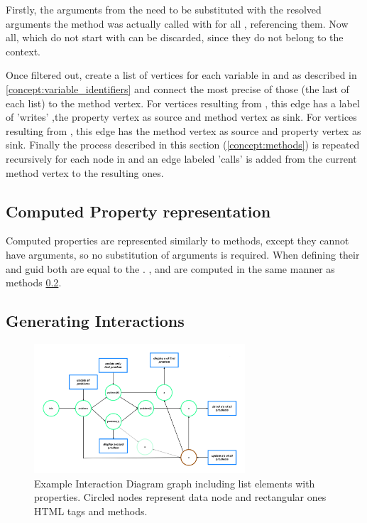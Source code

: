 Firstly, the arguments from the  need to be substituted with the resolved arguments the method was actually called with for all ,    referencing them. Now all, which do not start with  can be discarded, since they do not belong to the context. 

Once filtered out, create a list of vertices for each variable in  and  as described in \ref{concept:variable_identifiers} and connect the most precise of those (the last of each list) to the method vertex. For vertices resulting from , this edge has a label of 'writes' ,the property vertex as source and method vertex as sink. For vertices resulting from , this edge has the method vertex as source and property vertex as sink. 
Finally the process described in this section (\ref{concept:methods}) is repeated recursively for each  node in  and an edge labeled 'calls' is added from the current method vertex to the resulting ones. 

\subsection{Computed Property representation}
\label{concept:computed_property}

Computed properties are represented similarly to methods, except they cannot have arguments, so no substitution of arguments is required. When defining their  and \gls{guid} both are equal to the . ,  and  are computed in the same manner as methods \ref{concept:algorithm_create_diagrams}. 

\subsection{Generating Interactions}
\label{concept:algorithm_create_diagrams}
\begin{figure}[H]
    \centering
    \includegraphics[width=0.7\textwidth]{images/graph_complete_example.png}
     \caption{Example Interaction Diagram graph including list elements with properties. Circled nodes represent data node and rectangular ones HTML tags and methods.}
     \label{fig:graph_complete_example}
\end{figure}

